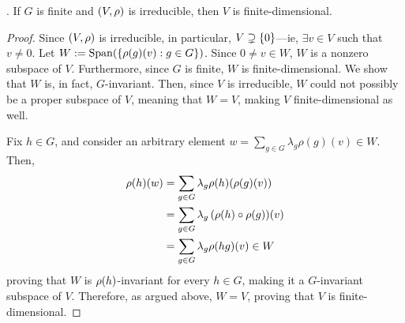 \begin{proposition}
    . If $G$ is finite and $\left( V,\rho \right)$ is irreducible, then $V$ is finite-dimensional.
\end{proposition}
\begin{proof}
    Since $\left( V, \rho \right)$ is irreducible, in particular, $V \supsetneq \left\{ 0 \right\}$---ie, $\exists v \in V$ such that $v \neq 0$. Let $W := \operatorname{Span}\!\left( \left\{ \rho\!\left( g \right)\!(v) : g \in G \right\} \right)$. Since $0 \neq v \in W$, $W$ is a nonzero subspace of $V$. Furthermore, since $G$ is finite, $W$ is finite-dimensional. We show that $W$ is, in fact, $G$-invariant. Then, since $V$ is irreducible, $W$ could not possibly be a proper subspace of $V$, meaning that $W = V$, making $V$ finite-dimensional as well.

    Fix $h \in G$, and consider an arbitrary element $w = \sum_{g \in G} \lambda_g \rho(g)(v) \in W$. Then,
    \begin{align*}
        \rho(h)(w) &= \sum_{g \in G} \lambda_g \rho(h)\!\left( \rho(g)(v) \right) \\
        &= \sum_{g \in G} \lambda_g \left( \rho(h) \circ \rho(g) \right)\!(v) \\
        &= \sum_{g \in G} \lambda_g \rho\!\left( hg \right)\!(v) \in W
    \end{align*}
    proving that $W$ is $\rho\!\left( h \right)$-invariant for every $h \in G$, making it a $G$-invariant subspace of $V$. Therefore, as argued above, $W = V$, proving that $V$ is finite-dimensional.
\end{proof}


